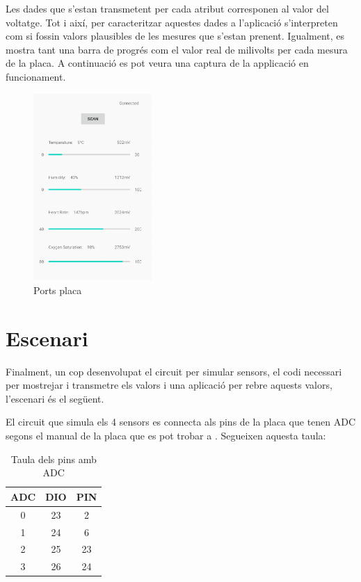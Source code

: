 Les dades que s'estan transmetent per cada atribut corresponen al valor del voltatge.
Tot i així, per caracteritzar aquestes dades a l'aplicació s'interpreten com si fossin valors plausibles de les mesures que s'estan prenent.
Igualment, es mostra tant una barra de progrés com el valor real de milivolts per cada mesura de la placa.
A continuació es pot veura una captura de la applicació en funcionament.

\begin{figure}[h]
	\begin{center}
		\includegraphics[width=0.4\textwidth]{./images/captura_app.jpg}
		\caption{Ports placa}
	\end{center}
\end{figure}

\section{Escenari}
Finalment, un cop desenvolupat el circuit per simular sensors, el codi necessari per mostrejar i transmetre els valors i una aplicació per rebre aquests valors, l'escenari és el següent.

El circuit que simula els 4 sensors es connecta als pins de la placa que tenen ADC segons el manual de la placa que es pot trobar a \cite{manual_placa}.
Segueixen aquesta taula:

\begin{table}[!h]
	\begin{center}
		\begin{tabular}{|c|c|c|}
			\hline
			ADC			&	DIO		& 	PIN		\\	\hline
			0			&	23		&	2		\\	\hline
			1			&	24		&	6		\\	\hline
			2			&	25		&	23		\\	\hline
			3			&	26		&	24		\\	\hline
		\end{tabular}
	\end{center}
	\caption{Taula dels pins amb ADC}
\end{table}

